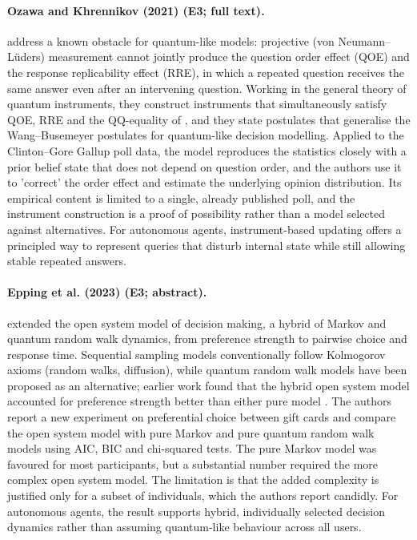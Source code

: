 \documentclass[10pt,a4paper]{article}
\begin{document}
\paragraph{Ozawa and Khrennikov (2021) (E3; full text).} \citet{Ozawa2021} address a known obstacle for quantum-like models: projective (von Neumann--Lüders) measurement cannot jointly produce the question order effect (QOE) and the response replicability effect (RRE), in which a repeated question receives the same answer even after an intervening question. Working in the general theory of quantum instruments, they construct instruments that simultaneously satisfy QOE, RRE and the QQ-equality of \citep{Wang2014}, and they state postulates that generalise the Wang--Busemeyer postulates for quantum-like decision modelling. Applied to the Clinton--Gore Gallup poll data, the model reproduces the statistics closely with a prior belief state that does not depend on question order, and the authors use it to 'correct' the order effect and estimate the underlying opinion distribution. Its empirical content is limited to a single, already published poll, and the instrument construction is a proof of possibility rather than a model selected against alternatives. For autonomous agents, instrument-based updating offers a principled way to represent queries that disturb internal state while still allowing stable repeated answers.

\paragraph{Epping et al. (2023) (E3; abstract).} \citet{Epping2023} extended the open system model of decision making, a hybrid of Markov and quantum random walk dynamics, from preference strength to pairwise choice and response time. Sequential sampling models conventionally follow Kolmogorov axioms (random walks, diffusion), while quantum random walk models have been proposed as an alternative; earlier work found that the hybrid open system model accounted for preference strength better than either pure model \citep{Kvam2021}. The authors report a new experiment on preferential choice between gift cards and compare the open system model with pure Markov and pure quantum random walk models using AIC, BIC and chi-squared tests. The pure Markov model was favoured for most participants, but a substantial number required the more complex open system model. The limitation is that the added complexity is justified only for a subset of individuals, which the authors report candidly. For autonomous agents, the result supports hybrid, individually selected decision dynamics rather than assuming quantum-like behaviour across all users.
\end{document}
